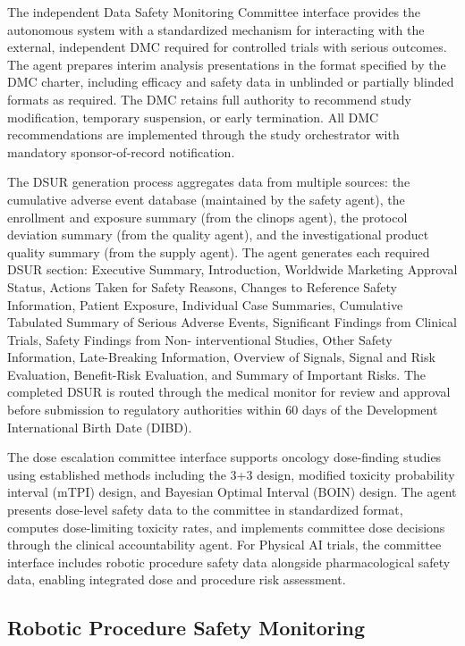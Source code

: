 The independent Data Safety Monitoring Committee interface provides the autonomous system
with a standardized mechanism for interacting with the external, independent DMC
required for controlled trials with serious outcomes. The agent prepares interim analysis
presentations in the format specified by the DMC charter, including efficacy and safety
data in unblinded or partially blinded formats as required. The DMC retains full authority
to recommend study modification, temporary suspension, or early termination. All DMC
recommendations are implemented through the study orchestrator with mandatory
sponsor-of-record notification.

The DSUR generation process aggregates data from multiple sources: the cumulative adverse
event database (maintained by the safety agent), the enrollment and exposure summary (from
the clinops agent), the protocol deviation summary (from the quality agent), and the
investigational product quality summary (from the supply agent). The agent generates each
required DSUR section: Executive Summary, Introduction, Worldwide Marketing Approval
Status, Actions Taken for Safety Reasons, Changes to Reference Safety Information,
Patient Exposure, Individual Case Summaries, Cumulative Tabulated Summary of Serious
Adverse Events, Significant Findings from Clinical Trials, Safety Findings from Non-
interventional Studies, Other Safety Information, Late-Breaking Information, Overview of
Signals, Signal and Risk Evaluation, Benefit-Risk Evaluation, and Summary of Important
Risks. The completed DSUR is routed through the medical monitor for review and approval
before submission to regulatory authorities within 60 days of the Development International
Birth Date (DIBD).

The dose escalation committee interface supports oncology dose-finding studies using
established methods including the 3+3 design, modified toxicity probability interval
(mTPI) design, and Bayesian Optimal Interval (BOIN) design. The agent presents
dose-level safety data to the committee in standardized format, computes dose-limiting
toxicity rates, and implements committee dose decisions through the clinical
accountability agent. For Physical AI trials, the committee interface includes robotic
procedure safety data alongside pharmacological safety data, enabling integrated
dose and procedure risk assessment.

\subsection{Robotic Procedure Safety Monitoring}


